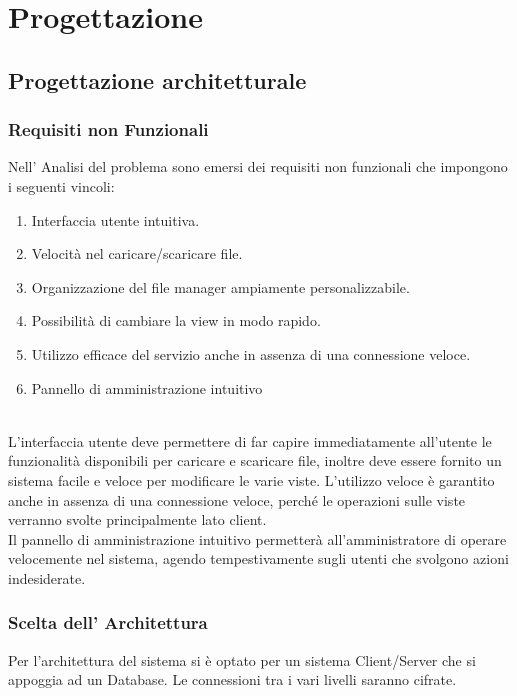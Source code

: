 \chapter*{Progettazione}
\section*{Progettazione architetturale}
\vspace{0.5cm}

\subsection*{Requisiti non Funzionali}
\vspace{0.5cm}
Nell' Analisi del problema sono emersi dei requisiti non funzionali che impongono i seguenti vincoli:

\begin{enumerate}
\item Interfaccia utente intuitiva.
\item Velocità nel caricare/scaricare file.
\item Organizzazione del file manager ampiamente personalizzabile.
\item Possibilità di cambiare la view in modo rapido.
\item Utilizzo efficace del servizio anche in assenza di una connessione veloce.
\item Pannello di amministrazione intuitivo
\end{enumerate}

\\
L'interfaccia utente deve permettere di far capire immediatamente all'utente le funzionalità disponibili per caricare e scaricare file, inoltre deve essere fornito un sistema facile e veloce per modificare le varie viste. L'utilizzo veloce è garantito anche in assenza di una connessione veloce, perché le operazioni sulle viste verranno svolte principalmente lato client.\\
Il pannello di amministrazione intuitivo permetterà all'amministratore di operare velocemente nel sistema, agendo tempestivamente sugli utenti che svolgono azioni indesiderate.


\subsection*{Scelta dell' Architettura}
Per l'architettura del sistema si è optato per un sistema Client/Server che si appoggia ad un Database. Le connessioni tra i vari livelli saranno cifrate.
\vspace{0.5cm}
